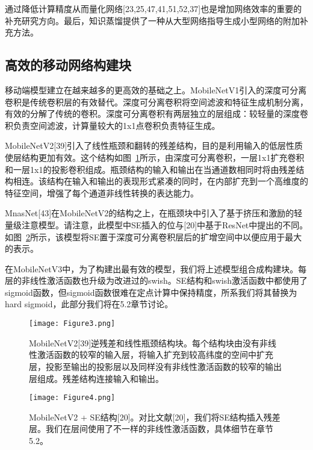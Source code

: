 通过降低计算精度从而量化网络[23,25,47,41,51,52,37]也是增加网络效率的重要的补充研究方向。最后，知识蒸馏提供了一种从大型网络指导生成小型网络的附加补充方法。

\subsection{高效的移动网络构建块}

移动端模型建立在越来越多的更高效的基础之上。MobileNetV1引入的深度可分离卷积是传统卷积层的有效替代。深度可分离卷积将空间滤波和特征生成机制分离，有效的分解了传统的卷积。深度可分离卷积有两层独立的层组成：较轻量的深度卷积负责空间滤波，计算量较大的1x1点卷积负责特征生成。

MobileNetV2[39]引入了线性瓶颈和翻转的残差结构，目的是利用输入的低层性质使层结构更加有效。这个结构如图~\ref{fig:trans_fig3}所示，由深度可分离卷积，一层1x1扩充卷积和一层1x1的投影卷积组成。瓶颈结构的输入和输出在当通道数相同时将由残差结构相连。该结构在输入和输出的表现形式紧凑的同时，在内部扩充到一个高维度的特征空间，增强了每个通道非线性转换的表达能力。

MnasNet[43]在MobileNetV2的结构之上，在瓶颈块中引入了基于挤压和激励的轻量级注意模型。请注意，此模型中SE插入的位与[20]中基于ResNet中提出的不同。如图~\ref{fig:trans_fig4}所示，该模型将SE置于深度可分离卷积层后的扩增空间中以便应用于最大的表示。

在MobileNetV3中，为了构建出最有效的模型，我们将上述模型组合成构建块。每层的非线性激活函数也升级为改进过的swish。SE结构和swish激活函数中都使用了sigmoid函数，但sigmoid函数很难在定点计算中保持精度，所系我们将其替换为hard sigmoid，此部分我们将在5.2章节讨论。

\begin{figure}[ht]
    \centering
    \texttt{[image: Figure3.png]}
    \caption{MobileNetV2[39]逆残差和线性瓶颈结构块。每个结构块由没有非线性激活函数的较窄的输入层，将输入扩充到较高纬度的空间中扩充层，投影至输出的投影层以及同样没有非线性激活函数的较窄的输出层组成。残差结构连接输入和输出。}
    \label{fig:trans_fig3}
\end{figure}


\begin{figure}[ht]
    \centering
    \texttt{[image: Figure4.png]}
    \caption{MobileNetV2 + SE结构[20]。对比文献[20]，我们将SE结构插入残差层。我们在层间使用了不一样的非线性激活函数，具体细节在章节5.2。}
    \label{fig:trans_fig4}
\end{figure}

